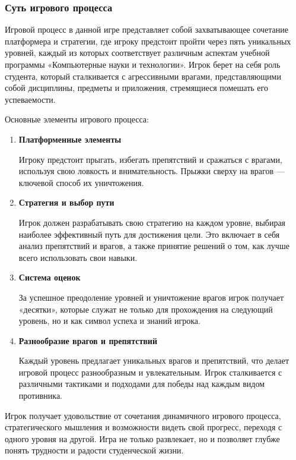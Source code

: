 \documentclass{article}
\begin{document}
\subsubsection{Суть игрового процесса}
    Игровой процесс в данной игре представляет собой захватывающее сочетание платформера и стратегии, где игроку предстоит пройти через пять уникальных уровней, каждый из которых соответствует различным аспектам учебной программы «Компьютерные науки и технологии». Игрок берет на себя роль студента, который сталкивается с агрессивными врагами, представляющими собой дисциплины, предметы и приложения, стремящиеся помешать его успеваемости.\par
    Основные элементы игрового процесса:\par
    \begin{enumerate}
    \item \textbf{Платформенные элементы} \par
    Игроку предстоит прыгать, избегать препятствий и сражаться с врагами, используя свою ловкость и внимательность. Прыжки сверху на врагов — ключевой способ их уничтожения.
    \item\textbf{Стратегия и выбор пути} \par
    Игрок должен разрабатывать свою стратегию на каждом уровне, выбирая наиболее эффективный путь для достижения цели. Это включает в себя анализ препятствий и врагов, а также принятие решений о том, как лучше всего использовать свои навыки.
    \item \textbf{Система оценок} \par
    За успешное преодоление уровней и уничтожение врагов игрок получает «десятки», которые служат не только для прохождения на следующий уровень, но и как символ успеха и знаний игрока.
    \item \textbf{Разнообразие врагов и препятствий} \par
    Каждый уровень предлагает уникальных врагов и препятствий, что делает игровой процесс разнообразным и увлекательным. Игрок сталкивается с различными тактиками и подходами для победы над каждым видом противника.
    \end{enumerate}
    Игрок получает удовольствие от сочетания динамичного игрового процесса, стратегического мышления и возможности видеть свой прогресс, переходя с одного уровня на другой. Игра не только развлекает, но и позволяет глубже понять трудности и радости студенческой жизни.
\end{document}
